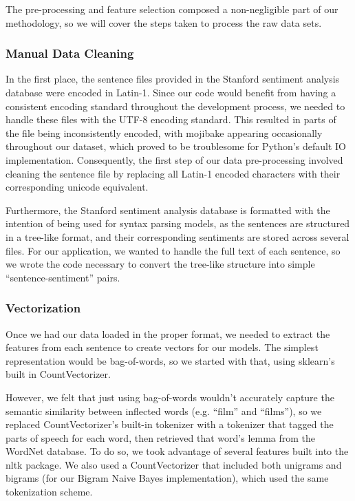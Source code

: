 \documentclass[conference]{IEEEtran}
\begin{document}
The pre-processing and feature selection composed a non-negligible part of our methodology, so we will cover the steps taken to process the raw data sets. 

\subsubsection{Manual Data Cleaning}

In the first place, the sentence files provided in the Stanford sentiment analysis database were encoded in Latin-1. Since our code would benefit from having a consistent encoding standard throughout the development process, we needed to handle these files with the UTF-8 encoding standard. This resulted in parts of the file being inconsistently encoded, with mojibake appearing occasionally throughout our dataset, which proved to be troublesome for Python's default IO implementation. Consequently, the first step of our data pre-processing involved cleaning the sentence file by replacing all Latin-1 encoded characters with their corresponding unicode equivalent.

Furthermore, the Stanford sentiment analysis database is formatted with the intention of being used for syntax parsing models, as the sentences are structured in a tree-like format, and their corresponding sentiments are stored across several files. For our application, we wanted to handle the full text of each sentence, so we wrote the code necessary to convert the tree-like structure into simple ``sentence-sentiment'' pairs.

\subsubsection{Vectorization}

Once we had our data loaded in the proper format, we needed to extract the features from each sentence to create vectors for our models. The simplest representation would be bag-of-words, so we started with that, using sklearn's built in CountVectorizer.

However, we felt that just using bag-of-words wouldn't accurately capture the semantic similarity between inflected words (e.g. ``film'' and ``films''), so we replaced CountVectorizer's built-in tokenizer with a tokenizer that tagged the parts of speech for each word, then retrieved that word's lemma from the WordNet database. To do so, we took advantage of several features built into the nltk package. We also used a CountVectorizer that included both unigrams and bigrams (for our Bigram Naive Bayes implementation), which used the same tokenization scheme.
\end{document}
